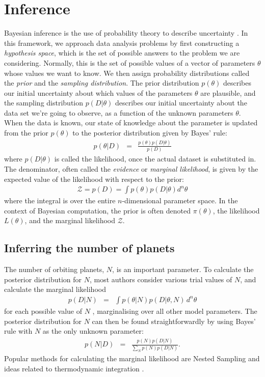 \documentclass[useAMS,usenatbib]{mn2e}
\begin{document}
\section{Inference}
Bayesian inference is the use of probability theory to describe uncertainty
\citep{sivia, ohagan}. In this framework, we approach data analysis problems by first
constructing a {\it hypothesis space}, which is the set of possible answers
to the problem we are considering. Normally, this is the set of possible
values of a vector of parameters $\theta$ whose values we want
to know. We then assign probability distributions
called the {\it prior} and the {\it sampling distribution}. The prior
distribution $p(\theta)$ describes
our initial uncertainty about which values of the parameters
$\theta$ are plausible, and the
sampling distribution $p(D | \theta)$ describes
our initial uncertainty about the data set we're going to observe, as a
function of the unknown parameters $\theta$.
When the data is known, our state of knowledge about the parameter is
updated from the prior $p(\theta)$ to the posterior distribution given by
Bayes' rule:
\begin{eqnarray}
p(\theta | D) &=&
\frac{p(\theta)p(D | \theta)}
{p(D)}
\end{eqnarray}
where $p(D | \theta)$ is called the likelihood, once the actual dataset
is substituted in.
The denominator, often called the {\it evidence} or
{\it marginal likelihood}, is given by the expected value of the likelihood
with respect to the prior:
\begin{eqnarray}
\mathcal{Z} = p(D) = \int p(\theta) p(D | \theta) d^n \theta
\end{eqnarray}
where the integral is over the entire $n$-dimensional parameter space.
In the context of Bayesian computation, the prior is often denoted $\pi(\theta)$,
the likelihood $L(\theta)$, and the marginal likelihood $\mathcal{Z}$.

\subsection{Inferring the number of planets}
The number of orbiting planets, $N$, is an important parameter.
To calculate the posterior distribution for $N$, most authors
consider various trial values of $N$, and calculate the marginal likelihood
\begin{eqnarray}
p(D | N) &=& \int p(\theta | N) p(D | \theta, N) \, d^n \theta
\end{eqnarray}
for each possible value of $N$
\citep[e.g.][]{2011MNRAS.415.2523G, 2011MNRAS.415.3462F, 2014MNRAS.437.3540F, fengji}, marginalising
over all other model parameters.
The posterior distribution for $N$ can then be found straightforwardly by
using Bayes' rule with $N$ as the only unknown parameter:
\begin{eqnarray}
p(N | D) &=& \frac{p(N)p(D | N)}{\sum_N p(N)p(D | N)}.
\end{eqnarray}
Popular
methods for calculating the marginal likelihood are Nested Sampling
\citep{skilling} and ideas related to thermodynamic integration
\citep[e.g.][]{neal}.
\end{document}
